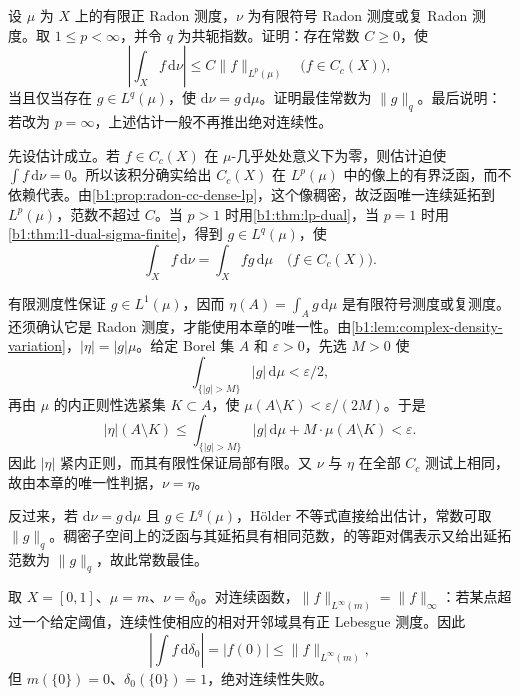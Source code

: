 \begin{exercise}\label{b1:ex:11-lp-measure-density}
设 \(\mu\) 为 \(X\) 上的有限正 Radon 测度，\(\nu\) 为有限符号 Radon 测度或复 Radon 测度。取 \(1\le p<\infty\)，并令 \(q\) 为共轭指数。证明：存在常数 \(C\ge0\)，使
\[
 \left|\int_Xf\,\mathrm d\nu\right|\le C\|f\|_{L^p(\mu)}
 \quad\bigl(f\in C_c(X)\bigr),
\]
当且仅当存在 \(g\in L^q(\mu)\)，使 \(\mathrm d\nu=g\,\mathrm d\mu\)。证明最佳常数为 \(\|g\|_q\)。最后说明：若改为 \(p=\infty\)，上述估计一般不再推出绝对连续性。
\end{exercise}
\begin{solution}
先设估计成立。若 \(f\in C_c(X)\) 在 \(\mu\)-几乎处处意义下为零，则估计迫使 \(\int f\,\mathrm d\nu=0\)。所以该积分确实给出 \(C_c(X)\) 在 \(L^p(\mu)\) 中的像上的有界泛函，而不依赖代表。由\cref{b1:prop:radon-cc-dense-lp}，这个像稠密，故泛函唯一连续延拓到 \(L^p(\mu)\)，范数不超过 \(C\)。当 \(p>1\) 时用\cref{b1:thm:lp-dual}，当 \(p=1\) 时用\cref{b1:thm:l1-dual-sigma-finite}，得到 \(g\in L^q(\mu)\)，使
\[
 \int_Xf\,\mathrm d\nu=\int_Xfg\,\mathrm d\mu
 \quad\bigl(f\in C_c(X)\bigr).
\]

有限测度性保证 \(g\in L^1(\mu)\)，因而 \(\eta(A)=\int_Ag\,\mathrm d\mu\) 是有限符号测度或复测度。还须确认它是 Radon 测度，才能使用本章的唯一性。由\cref{b1:lem:complex-density-variation}，\(|\eta|=|g|\mu\)。给定 Borel 集 \(A\) 和 \(\varepsilon>0\)，先选 \(M>0\) 使
\[
 \int_{\{|g|>M\}}|g|\,\mathrm d\mu<\varepsilon/2,
\]
再由 \(\mu\) 的内正则性选紧集 \(K\subset A\)，使 \(\mu(A\setminus K)<\varepsilon/(2M)\)。于是
\[
 |\eta|(A\setminus K)
 \le\int_{\{|g|>M\}}|g|\,\mathrm d\mu+M\cdot\mu(A\setminus K)
 <\varepsilon.
\]
因此 \(|\eta|\) 紧内正则，而其有限性保证局部有限。又 \(\nu\) 与 \(\eta\) 在全部 \(C_c\) 测试上相同，故由本章的唯一性判据，\(\nu=\eta\)。

反过来，若 \(\mathrm d\nu=g\,\mathrm d\mu\) 且 \(g\in L^q(\mu)\)，Hölder 不等式直接给出估计，常数可取 \(\|g\|_q\)。稠密子空间上的泛函与其延拓具有相同范数，的等距对偶表示又给出延拓范数为 \(\|g\|_q\)，故此常数最佳。

取 \(X=[0,1]\)、\(\mu=m\)、\(\nu=\delta_0\)。对连续函数，\(\|f\|_{L^\infty(m)}=\|f\|_\infty\)：若某点超过一个给定阈值，连续性使相应的相对开邻域具有正 Lebesgue 测度。因此
\[
 \left|\int f\,\mathrm d\delta_0\right|=|f(0)|
 \le\|f\|_{L^\infty(m)},
\]
但 \(m(\{0\})=0\)、\(\delta_0(\{0\})=1\)，绝对连续性失败。
\end{solution}

